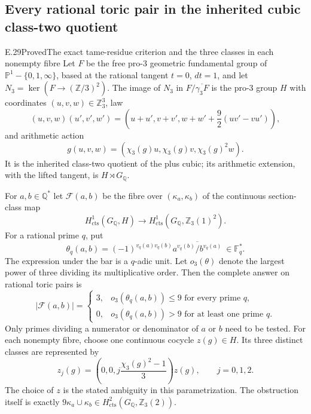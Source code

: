 \subsection{Every rational toric pair in the inherited cubic class-two quotient}

\begin{statement}{E.29}{Proved}{The exact tame-residue criterion and the three classes in each nonempty fibre}
Let $F$ be the free pro-$3$ geometric fundamental group of
$\mathbb P^1-\{0,1,\infty\}$, based at the rational tangent
$t=0$, $dt=1$, and let $N_3=\ker(F\to(\mathbb Z/3)^2)$.
The image of $N_3$ in $F/\overline{\gamma_3F}$ is the pro-$3$
group $H$ with coordinates $(u,v,w)\in\mathbb Z_3^3$, law
\[
 (u,v,w)(u',v',w')
 =\left(u+u',v+v',w+w'+\frac92(uv'-vu')\right),              \tag{E.29a}
\]
and arithmetic action
\[
 g(u,v,w)=(\chi_3(g)u,\chi_3(g)v,\chi_3(g)^2w).
\]
It is the inherited class-two quotient of the plus cubic;
its arithmetic extension, with the lifted tangent, is
$H\rtimes G_{\mathbb Q}$.

For $a,b\in\mathbb Q^*$ let $\mathscr F(a,b)$ be the fibre over
$(\kappa_a,\kappa_b)$ of the continuous section-class map
\[
 H^1_{\mathrm{cts}}(G_{\mathbb Q},H)
 \longrightarrow H^1_{\mathrm{cts}}
       (G_{\mathbb Q},\mathbb Z_3(1)^2).
\]
For a rational prime $q$, put
\[
 \theta_q(a,b)=
 (-1)^{v_q(a)v_q(b)}
 \overline{a^{v_q(b)}/b^{v_q(a)}}\ \in\mathbb F_q^*.
                                                               \tag{E.29b}
\]
The expression under the bar is a $q$-adic unit. Let
$o_3(\theta)$ denote the largest power of three dividing its
multiplicative order. Then the complete answer on rational
toric pairs is
\[
 |\mathscr F(a,b)|=
 \begin{cases}
 3,&o_3(\theta_q(a,b))\le9\text{ for every prime }q,\\
 0,&o_3(\theta_q(a,b))>9\text{ for at least one prime }q.
 \end{cases}                                                   \tag{E.29c}
\]
Only primes dividing a numerator or denominator of $a$ or $b$
need to be tested. For each nonempty fibre, choose one continuous
cocycle $z(g)\in H$. Its three distinct classes are represented by
\[
 z_j(g)=\left(0,0,j\frac{\chi_3(g)^2-1}{3}\right)z(g),
 \qquad j=0,1,2.                                               \tag{E.29d}
\]
The choice of $z$ is the stated ambiguity in this parametrization.
The obstruction itself is exactly
$9\kappa_a\cup\kappa_b\in
H^2_{\mathrm{cts}}(G_{\mathbb Q},\mathbb Z_3(2))$.


\end{statement}
